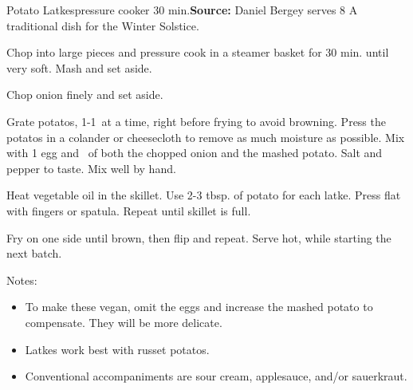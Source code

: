 \begin{recipe}{Potato Latkes}{pressure cooker \hfill 30 min.}{\textbf{Source:} Daniel Bergey \hfill serves 8}
  \freeform A traditional dish for the Winter Solstice.

Chop into large pieces and pressure cook in a steamer basket for 30 min. until very soft. Mash and set aside.

Chop onion finely and set aside.

Grate potatos, 1-1\ at a time, right before frying to avoid browning. Press the potatos in a colander or cheesecloth to remove as much moisture as possible. Mix with 1 egg and \ of both the chopped onion and the mashed potato. Salt and pepper to taste. Mix well by hand.

\newstep Heat vegetable oil in the skillet. Use 2-3 tbsp. of potato for each latke. Press flat with fingers or spatula. Repeat until skillet is full.

\newstep Fry on one side until brown, then flip and repeat. Serve hot, while starting the next batch.

\freeform Notes:
\begin{itemize}
  \item To make these vegan, omit the eggs and increase the mashed potato to compensate. They will be more delicate.
  \item Latkes work best with russet potatos.
  \item Conventional accompaniments are sour cream, applesauce, and/or sauerkraut.
\end{itemize}
\end{recipe}